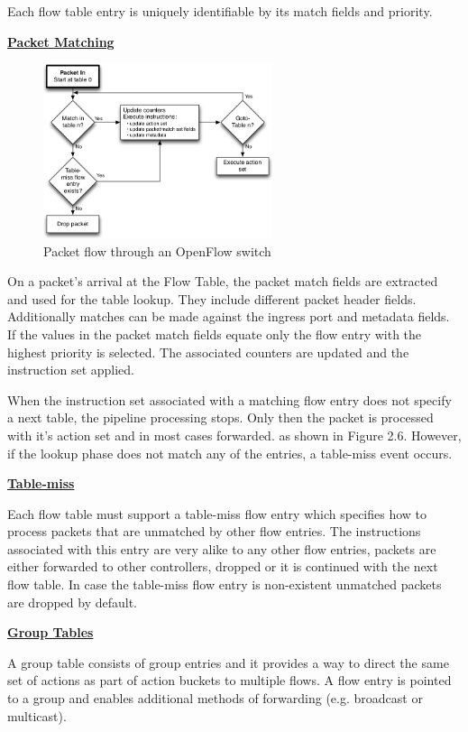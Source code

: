 Each flow table entry is uniquely identifiable by its match fields and priority. 


\underline{\textbf{Packet Matching}}

\begin{figure}[H]
\centering
\includegraphics[width=0.6\textwidth]{images/fundamentals/openflow_packet_matching.png}
\caption{Packet flow through an OpenFlow switch}
\end{figure}

On a packet's arrival at the Flow Table, the packet match fields are extracted and used for the table lookup. They include different packet header fields. Additionally matches can be made against the ingress port and metadata fields.
If the values in the packet match fields equate  only the flow entry with the highest priority is selected. The associated counters are updated and the instruction set applied.

When the instruction set associated with a matching flow entry does not specify a next table, the pipeline processing stops. Only then the packet is processed with it's action set and in most cases forwarded. as shown in Figure 2.6.
However, if the lookup phase does not match any of the entries, a table-miss event occurs.


\underline{\textbf{Table-miss}}

Each flow table must support a table-miss flow entry which specifies how to process packets that are unmatched by other flow entries. The instructions associated with this entry are very alike to any other flow entries, packets are either forwarded to other controllers, dropped or it is continued with the next flow table. In case the table-miss flow entry is non-existent unmatched packets are dropped by default. 


\underline{\textbf{Group Tables}}

A group table consists of group entries and it provides a way to direct the same set of actions as part of action buckets to multiple flows. A flow entry is pointed to a group and enables additional methods of forwarding (e.g. broadcast or multicast).


